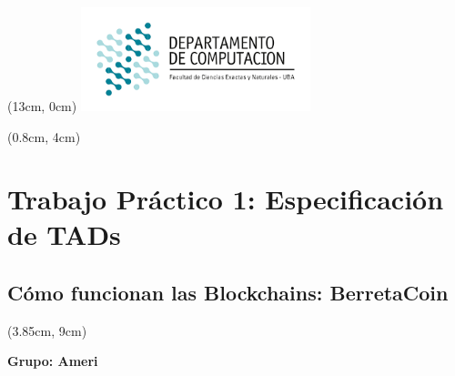 \documentclass{article}
\begin{document}
\thispagestyle{empty}


\begin{textblock*}{16cm} (13cm, 0cm)
    \includegraphics[width=0.5\textwidth]{dc_logo.png}
\end{textblock*}

\begin{textblock*}{20cm} (0.8cm, 4cm)
    \section*{Trabajo Práctico 1: Especificación de TADs}
    \subsection*{Cómo funcionan las Blockchains: \textdollar BerretaCoin}
    \noindent\makebox[\linewidth]{\rule{\paperwidth}{0.4pt}}
    \date{\today}
\end{textblock*}
\noindent\makebox[\linewidth]{\rule{\paperwidth}{0.4pt}}



\begin{textblock*}{13cm} (3.85cm, 9cm)
    \begin{center}
        \textbf{Grupo: Ameri}
    \end{center}
\end{textblock*}
\end{document}
